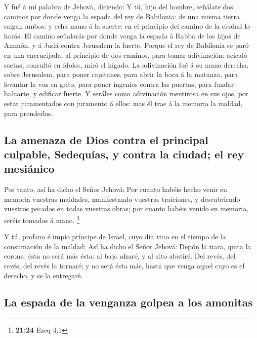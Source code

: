  Y fué á mí palabra de Jehová, diciendo:  Y
tú, hijo del hombre, señálate dos caminos por donde venga la espada del
rey de Babilonia: de una misma tierra salgan ambos: y echa mano á la
suerte: en el principio del camino de la ciudad lo harás. 
El camino señalarás por donde venga la espada á Rabba de los hijos de
Ammón, y á Judá contra Jerusalem la fuerte.  Porque el rey
de Babilonia se paró en una encrucijada, al principio de dos caminos,
para tomar adivinación: acicaló saetas, consultó en ídolos, miró el
hígado.  La adivinación fué á su mano derecha, sobre
Jerusalem, para poner capitanes, para abrir la boca á la matanza, para
levantar la voz en grito, para poner ingenios contra las puertas, para
fundar baluarte, y edificar fuerte.  Y seráles como
adivinación mentirosa en sus ojos, por estar juramentados con juramento
á ellos: mas él trae á la memoria la maldad, para prenderlos.

\hypertarget{la-amenaza-de-dios-contra-el-principal-culpable-sedequuxedas-y-contra-la-ciudad-el-rey-mesiuxe1nico}{%
\subsection{La amenaza de Dios contra el principal culpable, Sedequías,
y contra la ciudad; el rey
mesiánico}\label{la-amenaza-de-dios-contra-el-principal-culpable-sedequuxedas-y-contra-la-ciudad-el-rey-mesiuxe1nico}}

 Por tanto, así ha dicho el Señor Jehová: Por cuanto habéis
hecho venir en memoria vuestras maldades, manifestando vuestras
traiciones, y descubriendo vuestros pecados en todas vuestras obras; por
cuanto habéis venido en memoria, seréis tomados á mano. \footnote{\textbf{21:24}
  Ezeq 4,1}

 Y tú, profano é impío príncipe de Israel, cuyo día vino en
el tiempo de la consumación de la maldad;  Así ha dicho el
Señor Jehová: Depón la tiara, quita la corona: ésta no será más ésta: al
bajo alzaré, y al alto abatiré.  Del revés, del revés, del
revés la tornaré; y no será ésta más, hasta que venga aquel cuyo es el
derecho, y se la entregaré.

\hypertarget{la-espada-de-la-venganza-golpea-a-los-amonitas}{%
\subsection{La espada de la venganza golpea a los
amonitas}\label{la-espada-de-la-venganza-golpea-a-los-amonitas}}

